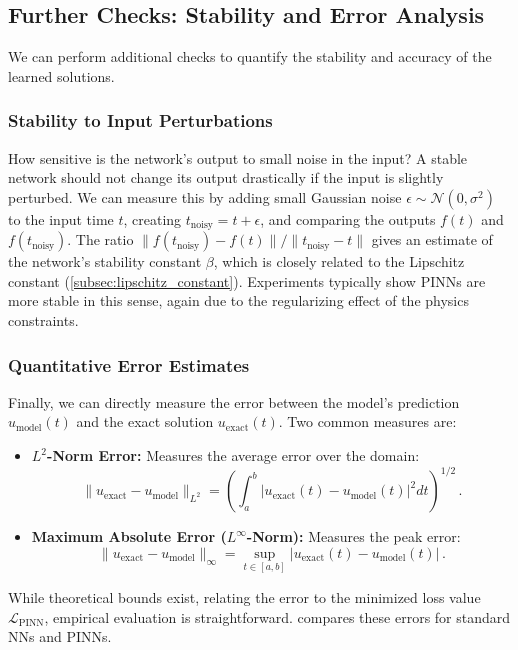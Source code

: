 \subsection{Further Checks: Stability and Error Analysis}

We can perform additional checks to quantify the stability and accuracy of the learned solutions.

\subsubsection{Stability to Input Perturbations}
How sensitive is the network's output to small noise in the input? A stable network should not change its output drastically if the input is slightly perturbed. We can measure this by adding small Gaussian noise $\epsilon \sim \mathcal{N}(0, \sigma^2)$ to the input time $t$, creating $t_{\text{noisy}} = t + \epsilon$, and comparing the outputs $f(t)$ and $f(t_{\text{noisy}})$. The ratio $\| f(t_{\text{noisy}}) - f(t) \| / \| t_{\text{noisy}} - t \|$ gives an estimate of the network's stability constant $\beta$, which is closely related to the Lipschitz constant (\cref{subsec:lipschitz_constant}). Experiments typically show PINNs are more stable in this sense, again due to the regularizing effect of the physics constraints.

\subsubsection{Quantitative Error Estimates}
Finally, we can directly measure the error between the model's prediction $u_{\text{model}}(t)$ and the exact solution $u_{\text{exact}}(t)$. Two common measures are:

\begin{itemize}
    \item \textbf{$L^2$-Norm Error:} Measures the average error over the domain:
    \[
    \| u_{\text{exact}} - u_{\text{model}} \|_{L^2} = \left( \int_{a}^{b} \left| u_{\text{exact}}(t) - u_{\text{model}}(t) \right|^2 dt \right)^{1/2}\,.
    \]
    \item \textbf{Maximum Absolute Error ($L^\infty$-Norm):} Measures the peak error:
    \[
    \| u_{\text{exact}} - u_{\text{model}} \|_{\infty} = \sup_{t \in [a, b]} \left| u_{\text{exact}}(t) - u_{\text{model}}(t) \right|\,.
    \]
\end{itemize}
%
While theoretical bounds exist, relating the error to the minimized loss value $\mathcal{L}_{\text{PINN}}$, empirical evaluation is straightforward.  compares these errors for standard NNs and PINNs.

